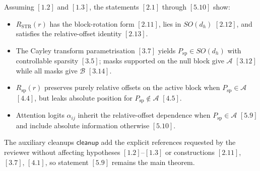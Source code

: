 \documentclass[11pt]{article}
\begin{document}
Assuming $[1.2]$ and $[1.3]$, the statements $[2.1]$ through $[5.10]$ show:

\begin{itemize}
    \item $R_{\mathrm{STR}}(r)$ has the block-rotation form $[2.11]$, lies in $SO(d_h)$ $[2.12]$, and satisfies the relative-offset identity $[2.13]$.
    \item The Cayley transform parametrisation $[3.7]$ yields $P_{\mathrm{sp}} \in SO(d_h)$ with controllable sparsity $[3.5]$; masks supported on the null block give $\mathcal{A}$ $[3.12]$ while all masks give $\mathcal{B}$ $[3.14]$.
    \item $R_{\mathrm{sp}}(r)$ preserves purely relative offsets on the active block when $P_{\mathrm{sp}} \in \mathcal{A}$ $[4.4]$, but leaks absolute position for $P_{\mathrm{sp}} \notin \mathcal{A}$ $[4.5]$.
    \item Attention logits $\alpha_{ij}$ inherit the relative-offset dependence when $P_{\mathrm{sp}} \in \mathcal{A}$ $[5.9]$ and include absolute information otherwise $[5.10]$.
\end{itemize}

The auxiliary cleanups $\mathsf{cleanup}$ add the explicit references requested by the reviewer without affecting hypotheses $[1.2]$–$[1.3]$ or constructions $[2.11]$, $[3.7]$, $[4.1]$, so statement $[5.9]$ remains the main theorem.
\end{document}
